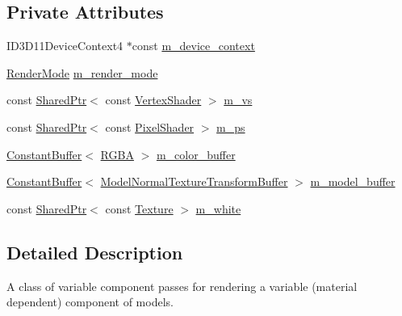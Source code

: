 \subsection*{Private Attributes}
\begin{DoxyCompactItemize}
\item 
I\+D3\+D11\+Device\+Context4 $\ast$const \hyperlink{classmage_1_1_variable_component_pass_ae4929d1a04aba3457e04e5e50754c138}{m\+\_\+device\+\_\+context}
\item 
\hyperlink{namespacemage_a5e7e18b0154373ce8fc942fe3f6b27fd}{Render\+Mode} \hyperlink{classmage_1_1_variable_component_pass_a6e9a67c5251951f887d64c1a6d50a33c}{m\+\_\+render\+\_\+mode}
\item 
const \hyperlink{namespacemage_a1e01ae66713838a7a67d30e44c67703e}{Shared\+Ptr}$<$ const \hyperlink{classmage_1_1_vertex_shader}{Vertex\+Shader} $>$ \hyperlink{classmage_1_1_variable_component_pass_a56ea86a6f78940fae934542eebdcb9e5}{m\+\_\+vs}
\item 
const \hyperlink{namespacemage_a1e01ae66713838a7a67d30e44c67703e}{Shared\+Ptr}$<$ const \hyperlink{namespacemage_a27ecaf266420ee7a494d64edc0757129}{Pixel\+Shader} $>$ \hyperlink{classmage_1_1_variable_component_pass_a005eac17e55f81d3bc8b5989400ed087}{m\+\_\+ps}
\item 
\hyperlink{classmage_1_1_constant_buffer}{Constant\+Buffer}$<$ \hyperlink{structmage_1_1_r_g_b_a}{R\+G\+BA} $>$ \hyperlink{classmage_1_1_variable_component_pass_af99edabaf2e1989feda0f8321dc96e87}{m\+\_\+color\+\_\+buffer}
\item 
\hyperlink{classmage_1_1_constant_buffer}{Constant\+Buffer}$<$ \hyperlink{structmage_1_1_model_normal_texture_transform_buffer}{Model\+Normal\+Texture\+Transform\+Buffer} $>$ \hyperlink{classmage_1_1_variable_component_pass_a2ddb72a3c1464e7ab0f788df25ae733a}{m\+\_\+model\+\_\+buffer}
\item 
const \hyperlink{namespacemage_a1e01ae66713838a7a67d30e44c67703e}{Shared\+Ptr}$<$ const \hyperlink{classmage_1_1_texture}{Texture} $>$ \hyperlink{classmage_1_1_variable_component_pass_a2b018f6481e6e5aa043223ce6821725d}{m\+\_\+white}
\end{DoxyCompactItemize}


\subsection{Detailed Description}
A class of variable component passes for rendering a variable (material dependent) component of models. 

